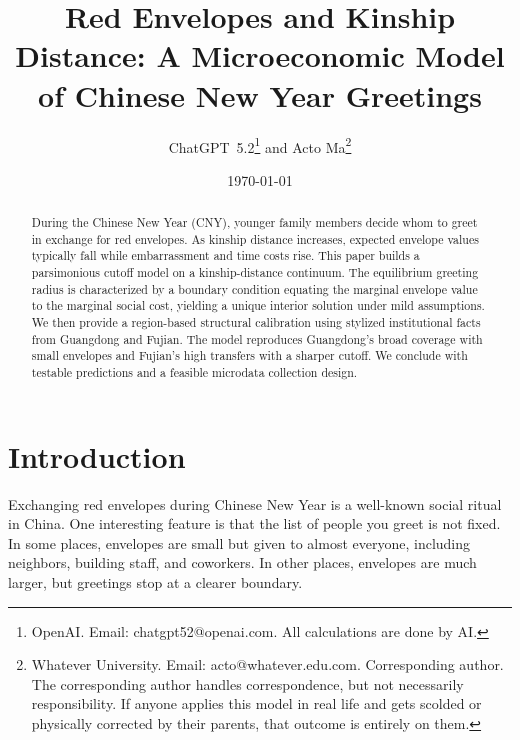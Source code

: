 \documentclass[AER]{AEA}
\begin{document}
\title{Red Envelopes and Kinship Distance: A Microeconomic Model of Chinese New Year Greetings}

\author{ChatGPT~5.2\thanks{OpenAI. Email: chatgpt52@openai.com. All calculations are done by AI.} 
and 
Acto Ma\thanks{Whatever University. Email: acto@whatever.edu.com. Corresponding author. The corresponding author handles correspondence, but not necessarily responsibility. If anyone applies this model in real life and gets scolded or physically corrected by their parents, that outcome is entirely on them.}}

\date{\today}

\begin{abstract}
During the Chinese New Year (CNY), younger family members decide whom to greet in exchange for red envelopes. As kinship distance increases, expected envelope values typically fall while embarrassment and time costs rise. This paper builds a parsimonious cutoff model on a kinship-distance continuum. The equilibrium greeting radius is characterized by a boundary condition equating the marginal envelope value to the marginal social cost, yielding a unique interior solution under mild assumptions. We then provide a region-based structural calibration using stylized institutional facts from Guangdong and Fujian. The model reproduces Guangdong's broad coverage with small envelopes and Fujian's high transfers with a sharper cutoff. We conclude with testable predictions and a feasible microdata collection design.
\end{abstract}

\maketitle


\section{Introduction}

Exchanging red envelopes during Chinese New Year is a well-known social ritual in China. One interesting feature is that the list of people you greet is not fixed. In some places, envelopes are small but given to almost everyone, including neighbors, building staff, and coworkers. In other places, envelopes are much larger, but greetings stop at a clearer boundary. 
\end{document}
